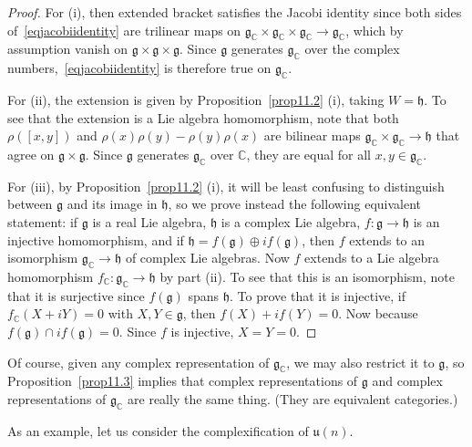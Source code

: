 \documentclass[12pt,reqno]{book}%
\theoremstyle{definition}
\theoremstyle{remark}
\theoremstyle{theorem}
\theoremstyle{remark}
\begin{document}
\begin{proof}%
    For (i), then extended bracket satisfies the Jacobi identity since both sides of~\eqref{eqjacobiidentity} are trilinear maps on $\mathfrak{g}_\mathbb{C} \times \mathfrak{g}_\mathbb{C} \times \mathfrak{g}_\mathbb{C} \to \mathfrak{g}_\mathbb{C}$, which by assumption vanish on $\mathfrak{g} \times \mathfrak{g} \times \mathfrak{g}$.
    Since $\mathfrak{g}$ generates $\mathfrak{g}_\mathbb{C}$ over the complex numbers,~\eqref{eqjacobiidentity} is therefore true on $\mathfrak{g}_\mathbb{C}$.

    For (ii), the extension is given by Proposition~\ref{prop11.2} (i), taking $W = \mathfrak{h}$.
    To see that the extension is a Lie algebra homomorphism, note that both $\rho([x, y])$ and $\rho(x)\rho(y) - \rho(y)\rho(x)$ are bilinear maps $\mathfrak{g}_\mathbb{C} \times \mathfrak{g}_\mathbb{C} \to \mathfrak{h}$ that agree on $\mathfrak{g} \times \mathfrak{g}$.
    Since $\mathfrak{g}$ generates $\mathfrak{g}_\mathbb{C}$ over $\mathbb{C}$, they are equal for all $x, y \in \mathfrak{g}_\mathbb{C}$.

    For (iii), by Proposition~\ref{prop11.2} (i), it will be least confusing to distinguish between $\mathfrak{g}$ and its image in $\mathfrak{h}$, so we prove instead the following equivalent statement: if $\mathfrak{g}$ is a real Lie algebra, $\mathfrak{h}$ is a complex Lie algebra, $f : \mathfrak{g} \to \mathfrak{h}$ is an injective homomorphism, and if $\mathfrak{h} = f(\mathfrak{g}) \oplus i f(\mathfrak{g})$, then $f$ extends to an isomorphism $\mathfrak{g}_\mathbb{C} \to \mathfrak{h}$ of complex Lie algebras.
    Now $f$ extends to a Lie algebra homomorphism $f_\mathbb{C} : \mathfrak{g}_\mathbb{C} \to \mathfrak{h}$ by part (ii).
    To see that this is an isomorphism, note that it is surjective since $f(\mathfrak{g})$ spans $\mathfrak{h}$.
    To prove that it is injective, if $f_\mathbb{C}(X + iY) = 0$ with $X, Y \in \mathfrak{g}$, then $f(X) +  i f(Y) = 0$.
    Now because $f(\mathfrak{g}) \cap i f(\mathfrak{g}) = 0$.
    Since $f$ is injective, $X = Y = 0$.
\end{proof}%

Of course, given any complex representation of $\mathfrak{g}_\mathbb{C}$, we may also restrict it to $\mathfrak{g}$, so Proposition~\ref{prop11.3} implies that complex representations of $\mathfrak{g}$ and complex representations of $\mathfrak{g}_\mathbb{C}$ are really the same thing.
(They are equivalent categories.)

As an example, let us consider the complexification of $\mathfrak{u}(n)$.
\end{document}

